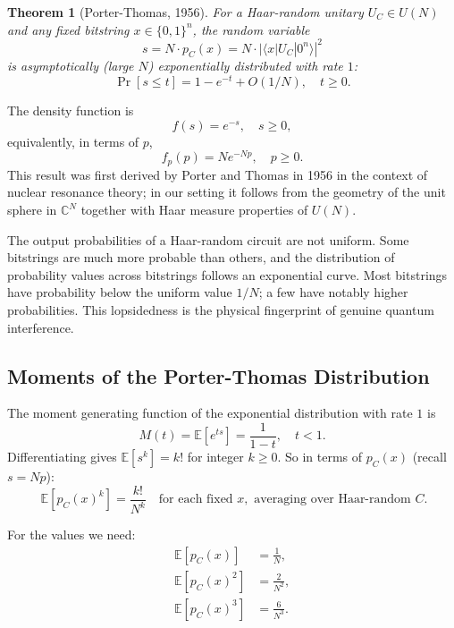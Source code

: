 \documentclass[11pt]{article}
\theoremstyle{plain}
\newtheorem{theorem}{Theorem}[section]
\theoremstyle{definition}
\newcommand{\E}{\mathbb{E}}
\newcommand{\ket}[1]{|#1\rangle}
\newcommand{\bra}[1]{\langle #1|}
\begin{document}
\begin{theorem}[Porter-Thomas, 1956]
For a Haar-random unitary $U_C \in U(N)$ and any fixed bitstring $x \in \{0,1\}^n$, the random variable
\[
s = N \cdot p_C(x) = N \cdot |\bra{x} U_C \ket{0^n}|^2
\]
is asymptotically (large $N$) exponentially distributed with rate $1$:
\[
\Pr[s \leq t] = 1 - e^{-t} + O(1/N), \quad t \geq 0.
\]
\label{thm:pt}
\end{theorem}

The density function is
\begin{equation}
f(s) = e^{-s}, \quad s \geq 0,
\label{eq:pt-density}
\end{equation}
equivalently, in terms of $p$,
\begin{equation}
f_p(p) = N e^{-Np}, \quad p \geq 0.
\label{eq:pt-p-density}
\end{equation}
This result was first derived by Porter and Thomas in 1956 in the context of nuclear resonance theory; in our setting it follows from the geometry of the unit sphere in $\mathbb{C}^N$ together with Haar measure properties of $U(N)$.

\begin{intuition}
The output probabilities of a Haar-random circuit are not uniform. Some bitstrings are much more probable than others, and the distribution of probability values across bitstrings follows an exponential curve. Most bitstrings have probability below the uniform value $1/N$; a few have notably higher probabilities. This lopsidedness is the physical fingerprint of genuine quantum interference.
\end{intuition}

\subsection{Moments of the Porter-Thomas Distribution}

The moment generating function of the exponential distribution with rate $1$ is
\[
M(t) = \E[e^{ts}] = \frac{1}{1-t}, \quad t < 1.
\]
Differentiating gives $\E[s^k] = k!$ for integer $k \geq 0$. So in terms of $p_C(x)$ (recall $s = Np$):
\begin{equation}
\boxed{\;\E[p_C(x)^k] = \frac{k!}{N^k} \quad \text{for each fixed } x, \text{ averaging over Haar-random } C.}
\label{eq:moments}
\end{equation}

For the values we need:
\begin{align}
\E[p_C(x)] &= \frac{1}{N}, \label{eq:moment1} \\
\E[p_C(x)^2] &= \frac{2}{N^2}, \label{eq:moment2} \\
\E[p_C(x)^3] &= \frac{6}{N^3}. \label{eq:moment3}
\end{align}
\end{document}
